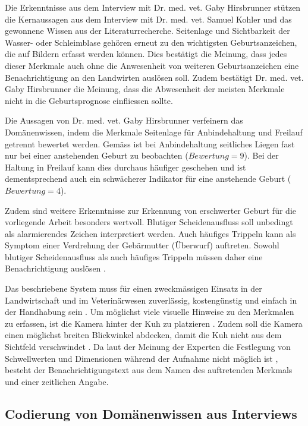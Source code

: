 Die Erkenntnisse aus dem Interview mit Dr. med. vet. Gaby Hirsbrunner \citep{Hirsbrunner2020} stützen die Kernaussagen aus dem Interview mit Dr. med. vet. Samuel Kohler und das gewonnene Wissen aus der Literaturrecherche. Seitenlage und Sichtbarkeit der Wasser- oder Schleimblase gehören erneut zu den wichtigsten Geburtsanzeichen, die auf Bildern erfasst werden können. Dies bestätigt die Meinung, dass jedes dieser Merkmale auch ohne die Anwesenheit von weiteren Geburtsanzeichen eine Benachrichtigung an den Landwirten auslösen soll. Zudem bestätigt Dr. med. vet. Gaby Hirsbrunner	die Meinung, dass die Abwesenheit der meisten Merkmale nicht in die Geburtsprognose einfliessen sollte.  

Die Aussagen von Dr. med. vet. Gaby Hirsbrunner verfeinern das Domänenwissen, indem die Merkmale Seitenlage für Anbindehaltung und Freilauf getrennt bewertet werden. Gemäss \citep{Hirsbrunner2020} ist bei Anbindehaltung seitliches Liegen fast nur bei einer anstehenden Geburt zu beobachten ($Bewertung=9$). Bei der Haltung in Freilauf kann dies durchaus häufiger geschehen und ist dementsprechend auch ein schwächerer Indikator für eine anstehende Geburt ($Bewertung=4$).

Zudem sind weitere Erkenntnisse zur Erkennung von erschwerter Geburt für die vorliegende Arbeit besonders wertvoll. Blutiger Scheidenausfluss soll unbedingt als alarmierendes Zeichen interpretiert werden. Auch häufiges Trippeln kann als Symptom einer Verdrehung der Gebärmutter (Überwurf) auftreten. Sowohl blutiger Scheidenausfluss als auch häufiges Trippeln müssen daher eine Benachrichtigung auslösen \citep{Hirsbrunner2020}.

Das beschriebene System muss für einen zweckmässigen Einsatz in der Landwirtschaft und im Veterinärwesen zuverlässig, kostengünstig und einfach in der Handhabung sein \citep{Hirsbrunner2020}. Um möglichst viele visuelle Hinweise zu den Merkmalen zu erfassen, ist die Kamera hinter der Kuh zu platzieren \citep{Hirsbrunner2020, Kohler2020}. Zudem soll die Kamera einen möglichst breiten Blickwinkel abdecken, damit die Kuh nicht aus dem Sichtfeld verschwindet \cite{Muller2020}. Da laut der Meinung der Experten die Festlegung von Schwellwerten und Dimensionen während der Aufnahme nicht möglich ist \citep{Hirsbrunner2020, Kohler2020}, besteht der Benachrichtigungstext aus dem Namen des auftretenden Merkmals und einer zeitlichen Angabe.

\subsection{Codierung von Domänenwissen aus Interviews}

